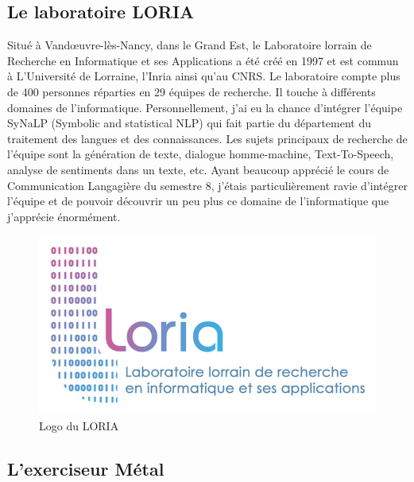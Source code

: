 \documentclass[12pt]{article}
\begin{document}
\subsection{Le laboratoire LORIA}

Situé à Vandœuvre-lès-Nancy, dans le Grand Est, le Laboratoire lorrain de Recherche en Informatique et ses Applications a été créé en 1997 et est commun à L’Université de Lorraine, l’Inria ainsi qu’au CNRS. Le laboratoire compte plus de 400 personnes réparties en 29 équipes de recherche. Il touche à différents domaines de l’informatique. 
Personnellement, j’ai eu la chance d’intégrer l’équipe SyNaLP (Symbolic and statistical NLP) qui fait partie du département du traitement des langues et des connaissances. Les sujets principaux de recherche de l’équipe sont la génération de texte, dialogue homme-machine, Text-To-Speech, analyse de sentiments dans un texte, etc. Ayant beaucoup apprécié le cours de Communication Langagière du semestre 8, j’étais particulièrement ravie d’intégrer l’équipe et de pouvoir découvrir un peu plus ce domaine de l’informatique que j’apprécie énormément. 



\begin{figure}[h]
    \centering
    \includegraphics[scale = 0.3]{logo_loria_complet.jpg}
    \caption{Logo du LORIA}
    \label{fig:my_label}
\end{figure}


\subsection{L'exerciseur Métal}
\end{document}
